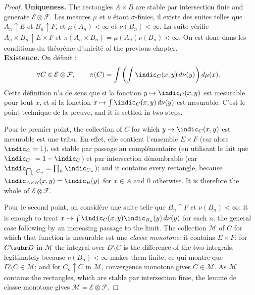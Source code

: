 \begin{proof}
  \textbf{Uniqueness.} The rectangles $A \times B$ are stable par intersection finie
  and generate $\mathcal{E} \otimes \mathcal{F}$. Les mesures $\mu$ et $\nu$ étant
  $\sigma$-finies, il existe des suites telles que $A_{n} \uparrow E$ et $B_{n}
  \uparrow F$, et $\mu(A_{n}) < \infty$ et $\nu(B_{n}) < \infty$. La suite vérifie
  $A_{n} \times B_{n} \uparrow E \times F$ et $\pi(A_{n} \times B_{n}) = \mu(A_{n})
  \nu(B_{n}) < \infty$. On est donc dans les conditions du théorème d'unicité of the
  previous chapter.\\

  \textbf{Existence.} On définit :
  \[
    \forall C \in \mathcal{E} \otimes \mathcal{F}, \qquad
    \pi(C) = \int \left( \int \indic_{C}(x,y) \, d\nu(y) \right) d\mu(x) .
  \]
  Cette définition n'a de sens que si la fonction $y \mapsto \indic_{C}(x,y)$ est
  mesurable pour tout $x$, et si la fonction $x \mapsto \int \indic_{C}(x,y) \,
  d\nu(y)$ est mesurable. C'est le point technique de la preuve, and it is settled
  in two steps.

  Pour le premier point, the collection of $C$ for which $y \mapsto \indic_{C}(x,y)$
  est mesurable est une tribu. En effet, elle contient l'ensemble $E \times F$ (car
  alors $\indic_{C} = 1$), est stable par passage au complémentaire (en utilisant le
  fait que $\indic_{C^{c}} = 1 - \indic_{C}$) et par intersection dénombrable (car
  $\indic_{\bigcap_{n} C_{n}} = \prod_{n} \indic_{C_{n}}$); and it contains every
  rectangle, because $\indic_{A \times B}(x,y) = \indic_{B}(y)$ for $x \in A$ and $0$
  otherwise. It is therefore the whole of $\mathcal{E} \otimes \mathcal{F}$.

  Pour le second point, on considère une suite telle que $B_{n} \uparrow F$ et
  $\nu(B_{n}) < \infty$; it is enough to treat $x \mapsto \int \indic_{C}(x,y)
  \indic_{B_{n}}(y) \, d\nu(y)$ for each $n$, the general case following by an
  increasing passage to the limit. The collection $\mathcal{M}$ of $C$ for which that
  function is mesurable est une \emph{classe monotone}: it contains $E \times F$;
  for $C \subr D$ in $\mathcal{M}$ the integral over $D \setminus C$ is the
  difference of the two integrals, legitimately because $\nu(B_{n}) < \infty$ makes
  them finite, ce qui montre que $D \setminus C \in \mathcal{M}$; and for $C_{k}
  \uparrow C$ in $\mathcal{M}$, convergence monotone gives $C \in \mathcal{M}$. As
  $\mathcal{M}$ contains the rectangles, which are stable par intersection finie,
  the lemme de classe monotone gives $\mathcal{M} = \mathcal{E} \otimes
  \mathcal{F}$.


\end{proof}
